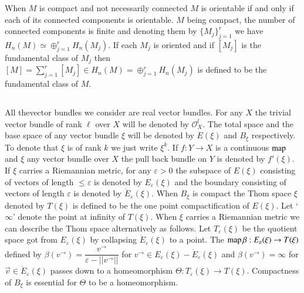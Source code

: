 When $M$ is compact and not necessarily connected $M$ is orientable if
and only if each of its connected components is orientable. $M$ being
compact, the number of connected components is finite and denoting
them by $\{M_j\}^r_{j=1}$ we have $H_n (M) \simeq \oplus^{r}_{j=1}
H_n (M_j)$. If each $M_j$ is oriented and if $[M_j]$ is the
fundamental class of $M_j$ then $[M] = \sum\limits^{r}_{j=1} [M_j]\in
H_n (M) = \oplus^{r}_{j=1} H_n (M_j)$ is defined to be the
fundamental class of $M$.  

\subsection{}\label{chap1:subsec1.4} %
All the\pageoriginale vector bundles we consider are real vector
bundles. For any 
$X$ the trivial vector bundle of rank $\ell$ over $X$ will be denoted
by $\mathscr{O}^l_X$. The total space and the base space of any vector
bundle $\xi$ will be denoted by $E(\xi)$ and $B_{\xi}$ respectively. To
denote that $\xi$ is of rank $k$ we just write $\xi^k$. If $f : Y\to
X$ is a continuous $\operatorname{map}$ and $\xi$ any vector bundle over $X$ the pull
back bundle on $Y$ is denoted by $f' (\xi)$. If $\xi$ carries a
Riemannian metric, for any $\varepsilon > 0$ the subspace of $E(\xi)$
consisting of vectors of length $\leq \varepsilon$ is denoted by $E_\varepsilon
(\xi)$ and the boundary consisting of vectors of length $\varepsilon$ is
denoted by $\dot{E}_\varepsilon (\xi)$. When $B_\xi$ is compact the Thom
space $\xi$ denoted by $T(\xi)$ is defined to be the one point
compactification of $E(\xi)$. Let `$\infty$' denote the point at
infinity of $T(\xi)$. When $\xi$ carries a Riemannian metric we can
describe the Thom space alternatively as follows. Let $T_\varepsilon
(\xi)$ be the quotient space got from $E_\varepsilon (\xi)$ by collapsing
$\dot{E}_\varepsilon (\xi)$ to a point. The $\operatorname{map} \beta : E_\varepsilon
(\xi) \to T(\xi)$ defined by $\beta (v^{\rightarrow}) =
\dfrac{v^{\rightarrow}}{\varepsilon -||v^{\rightarrow}||}$ for $v^{\to}
\in E_\varepsilon (\xi) - \dot{E}_\varepsilon (\xi)$ and $\beta
(v^{\to}) = \infty$ for $\overrightarrow{v}\in \dot{E}_\varepsilon
(\xi)$ passes 
down to a homeomorphism $\Theta :T_\varepsilon (\xi) \to
T(\xi)$. Compactness of $B_\xi$ is essential for $\Theta$ to be a
homeomorphism.  

